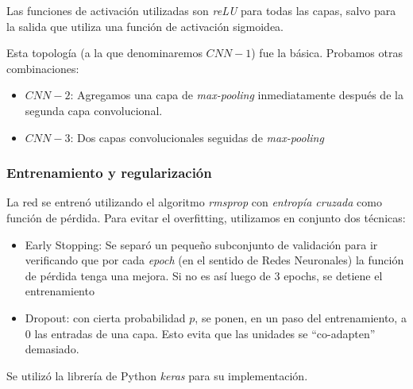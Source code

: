 Las funciones de activación utilizadas son \emph{reLU} para todas las capas, salvo para la salida que utiliza una función de activación sigmoidea.

Esta topología (a la que denominaremos $CNN-1$) fue la básica. Probamos otras combinaciones:

\begin{itemize}
    \item $CNN-2$: Agregamos una capa de \emph{max-pooling} inmediatamente después de la segunda capa convolucional.
    \item $CNN-3$: Dos capas convolucionales seguidas de \emph{max-pooling}
\end{itemize}

\subsubsection{Entrenamiento y regularización}

La red se entrenó utilizando el algoritmo \emph{rmsprop}\cite{tieleman2012lecture} con \emph{entropía cruzada} como función de pérdida. Para evitar el overfitting, utilizamos en conjunto dos técnicas:

\begin{itemize}
    \item Early Stopping: Se separó un pequeño subconjunto de validación para ir verificando que por cada \emph{epoch} (en el sentido de Redes Neuronales) la función de pérdida tenga una mejora. Si no es así luego de 3 epochs, se detiene el entrenamiento
    \item Dropout: con cierta probabilidad $p$, se ponen, en un paso del entrenamiento, a 0 las entradas de una capa. Esto evita que las unidades se ``co-adapten'' demasiado.
\end{itemize}

Se utilizó la librería de Python \emph{keras}\cite{chollet2015} para su implementación.

